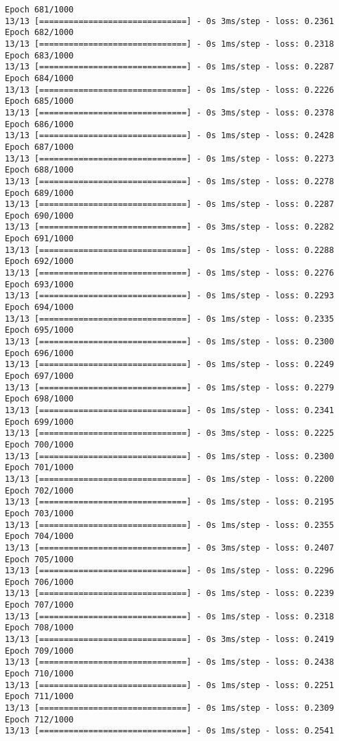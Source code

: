 \documentclass[11pt]{article}
\begin{document}
\begin{Verbatim}[commandchars=\\\{\}]
Epoch 681/1000
13/13 [==============================] - 0s 3ms/step - loss: 0.2361
Epoch 682/1000
13/13 [==============================] - 0s 1ms/step - loss: 0.2318
Epoch 683/1000
13/13 [==============================] - 0s 1ms/step - loss: 0.2287
Epoch 684/1000
13/13 [==============================] - 0s 1ms/step - loss: 0.2226
Epoch 685/1000
13/13 [==============================] - 0s 3ms/step - loss: 0.2378
Epoch 686/1000
13/13 [==============================] - 0s 1ms/step - loss: 0.2428
Epoch 687/1000
13/13 [==============================] - 0s 1ms/step - loss: 0.2273
Epoch 688/1000
13/13 [==============================] - 0s 1ms/step - loss: 0.2278
Epoch 689/1000
13/13 [==============================] - 0s 1ms/step - loss: 0.2287
Epoch 690/1000
13/13 [==============================] - 0s 3ms/step - loss: 0.2282
Epoch 691/1000
13/13 [==============================] - 0s 1ms/step - loss: 0.2288
Epoch 692/1000
13/13 [==============================] - 0s 1ms/step - loss: 0.2276
Epoch 693/1000
13/13 [==============================] - 0s 1ms/step - loss: 0.2293
Epoch 694/1000
13/13 [==============================] - 0s 1ms/step - loss: 0.2335
Epoch 695/1000
13/13 [==============================] - 0s 1ms/step - loss: 0.2300
Epoch 696/1000
13/13 [==============================] - 0s 1ms/step - loss: 0.2249
Epoch 697/1000
13/13 [==============================] - 0s 1ms/step - loss: 0.2279
Epoch 698/1000
13/13 [==============================] - 0s 1ms/step - loss: 0.2341
Epoch 699/1000
13/13 [==============================] - 0s 3ms/step - loss: 0.2225
Epoch 700/1000
13/13 [==============================] - 0s 1ms/step - loss: 0.2300
Epoch 701/1000
13/13 [==============================] - 0s 1ms/step - loss: 0.2200
Epoch 702/1000
13/13 [==============================] - 0s 1ms/step - loss: 0.2195
Epoch 703/1000
13/13 [==============================] - 0s 1ms/step - loss: 0.2355
Epoch 704/1000
13/13 [==============================] - 0s 3ms/step - loss: 0.2407
Epoch 705/1000
13/13 [==============================] - 0s 1ms/step - loss: 0.2296
Epoch 706/1000
13/13 [==============================] - 0s 1ms/step - loss: 0.2239
Epoch 707/1000
13/13 [==============================] - 0s 1ms/step - loss: 0.2318
Epoch 708/1000
13/13 [==============================] - 0s 3ms/step - loss: 0.2419
Epoch 709/1000
13/13 [==============================] - 0s 1ms/step - loss: 0.2438
Epoch 710/1000
13/13 [==============================] - 0s 1ms/step - loss: 0.2251
Epoch 711/1000
13/13 [==============================] - 0s 1ms/step - loss: 0.2309
Epoch 712/1000
13/13 [==============================] - 0s 1ms/step - loss: 0.2541

\end{Verbatim}
\end{document}

